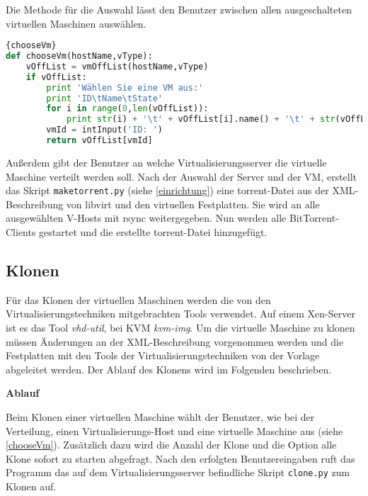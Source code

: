 Die Methode für die Auswahl lässt den Benutzer zwischen allen ausgeschalteten virtuellen Maschinen auswählen.
\\
\begin{lstlisting}[caption=VM-Auswahl,language=Python, label=chooseVm]{chooseVm}
def chooseVm(hostName,vType):
	vOffList = vmOffList(hostName,vType)
	if vOffList:
		print 'Wählen Sie eine VM aus:'
		print 'ID\tName\tState'
		for i in range(0,len(vOffList)):
			print str(i) + '\t' + vOffList[i].name() + '\t' + str(vOffList[i].info()[0])
		vmId = intInput('ID: ')
		return vOffList[vmId]
\end{lstlisting}
Außerdem gibt der Benutzer an welche Virtualisierungsserver die virtuelle Maschine verteilt werden soll. Nach der Auswahl der Server und der VM, erstellt das Skript \lstinline|maketorrent.py| (siehe \ref{einrichtung}) eine torrent-Datei aus der XML-Beschreibung von libvirt und den virtuellen Festplatten. Sie wird an alle ausgewählten V-Hosts mit rsync weitergegeben. Nun werden alle BitTorrent-Clients gestartet und die erstellte torrent-Datei hinzugefügt.

\subsection{Klonen}
Für das Klonen der virtuellen Maschinen werden die von den Virtualisierungstechniken mitgebrachten Tools verwendet. Auf einem Xen-Server ist es das Tool \textit{vhd-util}, bei KVM \textit{kvm-img}. Um die virtuelle Maschine zu klonen müssen Änderungen an der XML-Beschreibung vorgenommen werden und die Festplatten mit den Tools der Virtualisierungstechniken von der Vorlage abgeleitet werden. Der Ablauf des Klonens wird im Folgenden beschrieben.  %

\textbf{Ablauf}

Beim Klonen einer virtuellen Maschine wählt der Benutzer, wie bei der Verteilung, einen Virtualisierungs-Host und eine virtuelle Maschine aus (siehe \ref{chooseVm}). Zusätzlich dazu wird die Anzahl der Klone und die Option alle Klone sofort zu starten abgefragt. Nach den erfolgten Benutzereingaben ruft das Programm das auf dem Virtualisierungsserver befindliche Skript \lstinline|clone.py| zum Klonen auf.


